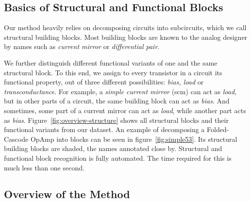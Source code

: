 \documentclass[conference]{IEEEtran}
\begin{document}
 	\subsection{Basics of Structural and Functional Blocks}
 	Our method heavily relies on decomposing circuits into subcircuits, which we call structural building blocks. Most building blocks are known to the analog designer by names such as \textit{current mirror} or \textit{differential pair}.

	We further distinguish different functional variants of one and the same structural block.
	To this end, we assign to every transistor in a circuit its functional property, out of three different possibilities: \textit{bias, load} or \textit{transconductance}. 
	 For example, a \textit{simple current mirror} (scm) can act as \textit{load}, but in other parts of a circuit, the same building block can act as \textit{bias}. And sometimes, some part of a current mirror can act as \textit{load}, while another part acts as \textit{bias}. Figure~\ref{fig:overview-structure} shows all structural blocks and their functional variants from our dataset.
	An example of decomposing a Folded-Cascode OpAmp into blocks can be seen in figure~\ref{fig:simple53}. Its structural building blocks are shaded, the names annotated close by.
	Structural and functional block recognition is fully automated. The time required for this is much less than one second. 
	
\subsection{Overview of the Method}
\end{document}
